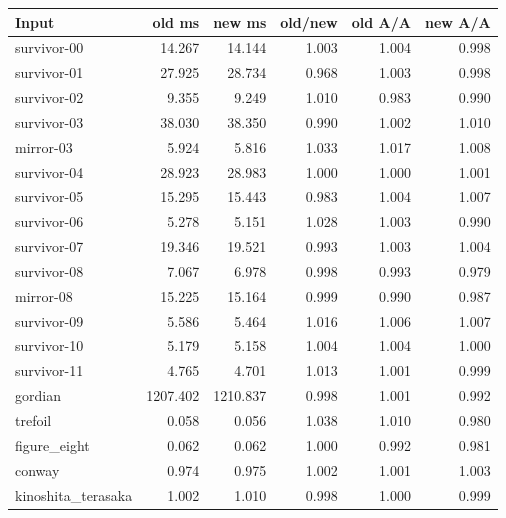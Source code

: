 \begin{center}\small
\begin{tabular}{@{}lrrrrr@{}}
\toprule
Input & old ms & new ms & old/new & old A/A & new A/A \\
\midrule
survivor-00 & 14.267 & 14.144 & 1.003 & 1.004 & 0.998 \\
survivor-01 & 27.925 & 28.734 & 0.968 & 1.003 & 0.998 \\
survivor-02 & 9.355 & 9.249 & 1.010 & 0.983 & 0.990 \\
survivor-03 & 38.030 & 38.350 & 0.990 & 1.002 & 1.010 \\
mirror-03 & 5.924 & 5.816 & 1.033 & 1.017 & 1.008 \\
survivor-04 & 28.923 & 28.983 & 1.000 & 1.000 & 1.001 \\
survivor-05 & 15.295 & 15.443 & 0.983 & 1.004 & 1.007 \\
survivor-06 & 5.278 & 5.151 & 1.028 & 1.003 & 0.990 \\
survivor-07 & 19.346 & 19.521 & 0.993 & 1.003 & 1.004 \\
survivor-08 & 7.067 & 6.978 & 0.998 & 0.993 & 0.979 \\
mirror-08 & 15.225 & 15.164 & 0.999 & 0.990 & 0.987 \\
survivor-09 & 5.586 & 5.464 & 1.016 & 1.006 & 1.007 \\
survivor-10 & 5.179 & 5.158 & 1.004 & 1.004 & 1.000 \\
survivor-11 & 4.765 & 4.701 & 1.013 & 1.001 & 0.999 \\
gordian & 1207.402 & 1210.837 & 0.998 & 1.001 & 0.992 \\
trefoil & 0.058 & 0.056 & 1.038 & 1.010 & 0.980 \\
figure\_eight & 0.062 & 0.062 & 1.000 & 0.992 & 0.981 \\
conway & 0.974 & 0.975 & 1.002 & 1.001 & 1.003 \\
kinoshita\_terasaka & 1.002 & 1.010 & 0.998 & 1.000 & 0.999 \\
\bottomrule
\end{tabular}
\end{center}
